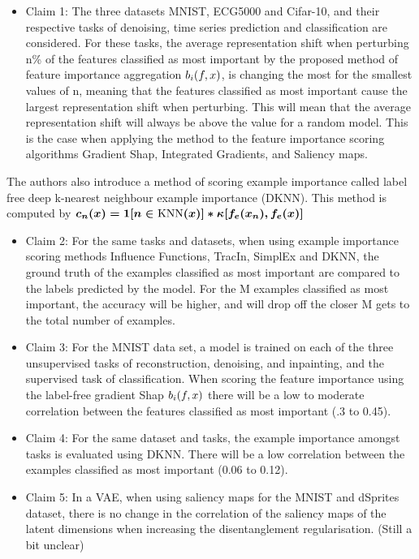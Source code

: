     \begin{itemize}
 
    \item Claim 1: The three datasets MNIST, ECG5000 and Cifar-10, and their respective tasks of denoising, time series prediction and classification are considered. For these tasks, the average representation shift when perturbing n\% of the features classified as most important by the proposed method of feature importance aggregation $b_i(\boldmath{f},\boldmath{x})$, is changing the most for the smallest values of n, meaning that the features classified as most important cause the largest representation shift when perturbing. This will mean that the average representation shift will always be above the value for a random model. This is the case when applying the method to the feature importance scoring algorithms Gradient Shap, Integrated Gradients, and Saliency maps. 
    \end{itemize}
    The authors also introduce a method of scoring example importance called label free deep k-nearest neighbour example importance (DKNN). This method is computed by $c_n(\boldmath{x})=\boldmath{1}[n\in\text{KNN}(x)]*\kappa[\boldmath{f}_e(\boldmath{x}_n),\boldmath{f}_e(\boldmath{x})]$
    \begin{itemize}
    \item Claim 2: For the same tasks and datasets, when using example importance scoring methods Influence Functions, TracIn, SimplEx and DKNN, the ground truth of the examples classified as most important are compared to the labels predicted by the model. For the M examples classified as most important, the accuracy will be higher, and will drop off the closer M gets to the total number of examples. 
    
    \item Claim 3: For the MNIST data set, a model is trained on each of the three unsupervised tasks of reconstruction, denoising, and inpainting, and the supervised task of classification. When scoring the feature importance using the label-free gradient Shap $b_i(\boldmath{f},\boldmath{x})$ there will be a low to moderate correlation between the features classified as most important (.3 to 0.45). 

    \item Claim 4: For the same dataset and tasks, the example importance amongst tasks is evaluated using DKNN. There will be a low correlation between the examples classified as most important (0.06 to 0.12).
    
    \item Claim 5: In a VAE, when using saliency maps for the MNIST and dSprites dataset, there is no change in the correlation of the saliency maps of the latent dimensions when increasing the disentanglement regularisation. (Still a bit unclear)
\end{itemize}

